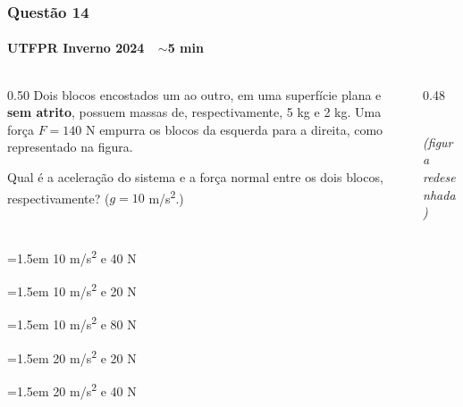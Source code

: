 \documentclass[aspectratio=169,12pt]{beamer}
\newcommand{\optitem}[2]{%
  \par\hangindent=1.5em\hangafter=1
  \makebox[1.5em][l]{\textbf{#1)}}#2}
\newcommand{\alternativascols}[5]{%
  \par\vspace{0.5em}%
  \begingroup\setlength{\parskip}{0.28em}%
  \noindent
  \begin{minipage}[t]{0.48\textwidth}
    \optitem{a}{#1}\optitem{b}{#2}\optitem{c}{#3}
  \end{minipage}\hfill
  \begin{minipage}[t]{0.48\textwidth}
    \optitem{d}{#4}\optitem{e}{#5}
  \end{minipage}%
  \par\endgroup}
\begin{document}
\begin{frame}
\frametitle{Quest\~ao 14}
\framesubtitle{UTFPR Inverno 2024 \,\textperiodcentered\, $\sim$5 min}

\begin{columns}[T]
\begin{column}{0.50\textwidth}
Dois blocos encostados um ao outro, em uma superf\'icie plana e
\textbf{sem atrito}, possuem massas de, respectivamente, 5 kg e 2 kg.
Uma for\c{c}a $F = 140$ N empurra os blocos da esquerda para a direita,
como representado na figura.

\vspace{0.4em}
Qual \'e a acelera\c{c}\~ao do sistema e a for\c{c}a
normal entre os dois blocos, respectivamente?
($g = 10$ m/s\textsuperscript{2}.)
\end{column}
\begin{column}{0.48\textwidth}
\centering
{}\\[0.3em]
{\scriptsize\itshape (figura redesenhada)}
\end{column}
\end{columns}

\vspace{-0.2em}
\alternativascols{10 m/s\textsuperscript{2} e 40 N}%
{10 m/s\textsuperscript{2} e 20 N}%
{10 m/s\textsuperscript{2} e 80 N}%
{20 m/s\textsuperscript{2} e 20 N}%
{20 m/s\textsuperscript{2} e 40 N}
\end{frame}
\end{document}
